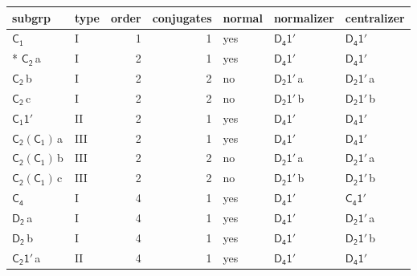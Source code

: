 \documentclass[10pt,a4paper]{article}
\numberwithin{equation}{section}
\newcommand{\grp}[1]{\mathsf{#1}}
\newcommand{\clsletter}[1]{\,{\scriptsize\color{black!55}#1}}
\begin{document}
{\small\begin{longtable}{@{}llrrlll@{}}\toprule
subgrp & type & order & conjugates & normal & normalizer & centralizer\\\midrule\endhead
\bottomrule\endfoot\endlastfoot
\href{../../../rotation/data/pdf/C1.pdf}{$\grp{C_{1}}$} & I & 1 & 1 & yes & \href{D4-1p.pdf}{$\grp{D_{4}1'}$} & \href{D4-1p.pdf}{$\grp{D_{4}1'}$}\\*
\href{../../../rotation/data/pdf/C2.pdf}{$\grp{C_{2}}$}\clsletter{a} & I & 2 & 1 & yes & \href{D4-1p.pdf}{$\grp{D_{4}1'}$} & \href{D4-1p.pdf}{$\grp{D_{4}1'}$}\\
\href{../../../rotation/data/pdf/C2.pdf}{$\grp{C_{2}}$}\clsletter{b} & I & 2 & 2 & no & \href{D2-1p.pdf}{$\grp{D_{2}1'}$}\clsletter{a} & \href{D2-1p.pdf}{$\grp{D_{2}1'}$}\clsletter{a}\\
\href{../../../rotation/data/pdf/C2.pdf}{$\grp{C_{2}}$}\clsletter{c} & I & 2 & 2 & no & \href{D2-1p.pdf}{$\grp{D_{2}1'}$}\clsletter{b} & \href{D2-1p.pdf}{$\grp{D_{2}1'}$}\clsletter{b}\\
\href{C1-1p.pdf}{$\grp{C_{1}1'}$} & II & 2 & 1 & yes & \href{D4-1p.pdf}{$\grp{D_{4}1'}$} & \href{D4-1p.pdf}{$\grp{D_{4}1'}$}\\
\href{C2-C1.pdf}{$\grp{C_{2}}(\grp{C_{1}})$}\clsletter{a} & III & 2 & 1 & yes & \href{D4-1p.pdf}{$\grp{D_{4}1'}$} & \href{D4-1p.pdf}{$\grp{D_{4}1'}$}\\
\href{C2-C1.pdf}{$\grp{C_{2}}(\grp{C_{1}})$}\clsletter{b} & III & 2 & 2 & no & \href{D2-1p.pdf}{$\grp{D_{2}1'}$}\clsletter{a} & \href{D2-1p.pdf}{$\grp{D_{2}1'}$}\clsletter{a}\\
\href{C2-C1.pdf}{$\grp{C_{2}}(\grp{C_{1}})$}\clsletter{c} & III & 2 & 2 & no & \href{D2-1p.pdf}{$\grp{D_{2}1'}$}\clsletter{b} & \href{D2-1p.pdf}{$\grp{D_{2}1'}$}\clsletter{b}\\
\href{../../../rotation/data/pdf/C4.pdf}{$\grp{C_{4}}$} & I & 4 & 1 & yes & \href{D4-1p.pdf}{$\grp{D_{4}1'}$} & \href{C4-1p.pdf}{$\grp{C_{4}1'}$}\\
\href{../../../rotation/data/pdf/D2.pdf}{$\grp{D_{2}}$}\clsletter{a} & I & 4 & 1 & yes & \href{D4-1p.pdf}{$\grp{D_{4}1'}$} & \href{D2-1p.pdf}{$\grp{D_{2}1'}$}\clsletter{a}\\
\href{../../../rotation/data/pdf/D2.pdf}{$\grp{D_{2}}$}\clsletter{b} & I & 4 & 1 & yes & \href{D4-1p.pdf}{$\grp{D_{4}1'}$} & \href{D2-1p.pdf}{$\grp{D_{2}1'}$}\clsletter{b}\\
\href{C2-1p.pdf}{$\grp{C_{2}1'}$}\clsletter{a} & II & 4 & 1 & yes & \href{D4-1p.pdf}{$\grp{D_{4}1'}$} & \href{D4-1p.pdf}{$\grp{D_{4}1'}$}\\

\end{longtable}}
\end{document}
